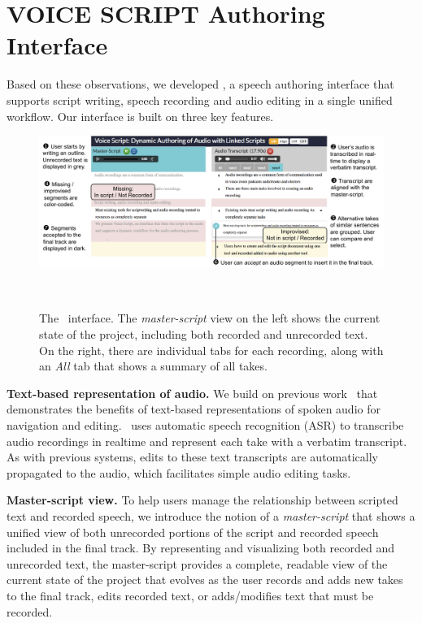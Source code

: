 \section{VOICE SCRIPT Authoring Interface}

Based on these observations, we developed \systemname, a speech authoring interface that supports script writing, speech recording and audio editing in a single unified workflow. Our interface is built on three key features.

\begin{figure}
  \centering
  \includegraphics[width=2.0\columnwidth]{figures/ui_aligned2}
  \caption{The \systemname\ interface. The \textit{master-script} view on the left shows the current state of the project, including both recorded and unrecorded text. On the right, there are individual tabs for each recording, along with an \textit{All} tab that shows a summary of all takes.}~\label{fig:ui_aligned}
\end{figure}

\textbf{Text-based representation of audio.} We build on previous work~\cite{casares2002simplifying,whittaker2004semantic,berthouzoz2012tools,rubin2013content} that demonstrates the benefits of text-based representations of spoken audio for navigation and editing. \systemname\ uses automatic speech recognition (ASR) to transcribe audio recordings in realtime and represent each take with a verbatim transcript. As with previous systems, edits to these text transcripts are automatically propagated to the audio, which facilitates simple audio editing tasks. 

\textbf{Master-script view.} To help users manage the relationship between scripted text and recorded speech, we introduce the notion of a \emph{master-script} that shows a unified view of both unrecorded portions of the script and recorded speech included in the final track. By representing and visualizing both recorded and unrecorded text, the master-script provides a complete, readable view of the current state of the project that evolves as the user records and adds new takes to the final track, edits recorded text, or adds/modifies text that must be recorded. 

